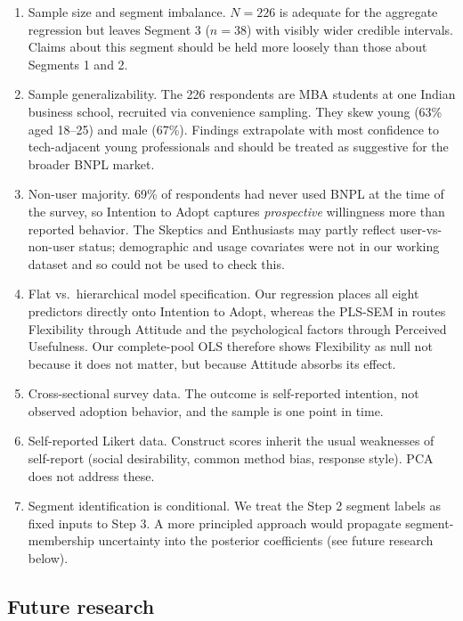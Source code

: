 \documentclass[11pt]{article}
\begin{document}
\begin{enumerate}
  \item Sample size and segment imbalance. $N = 226$ is adequate for
        the aggregate regression but leaves Segment 3 ($n = 38$)
        with visibly wider credible intervals. Claims about this
        segment should be held more loosely than those about
        Segments 1 and 2.
  \item Sample generalizability. The 226 respondents are MBA
        students at one Indian business school, recruited via
        convenience sampling. They skew young (63\% aged 18--25)
        and male (67\%). Findings extrapolate with most confidence
        to tech-adjacent young professionals and should be treated
        as suggestive for the broader BNPL market.
  \item Non-user majority. 69\% of respondents had never used BNPL
        at the time of the survey, so Intention to Adopt captures
        \emph{prospective} willingness more than reported behavior.
        The Skeptics and Enthusiasts may partly reflect
        user-vs-non-user status; demographic and usage covariates
        were not in our working dataset and so could not be used to
        check this.
  \item Flat vs.\ hierarchical model specification. Our regression
        places all eight predictors directly onto Intention to
        Adopt, whereas the PLS-SEM in \citet{dadra2024tep} routes
        Flexibility through Attitude and the psychological factors
        through Perceived Usefulness. Our complete-pool OLS
        therefore shows Flexibility as null not because it does not
        matter, but because Attitude absorbs its effect.
  \item Cross-sectional survey data. The outcome is self-reported
        intention, not observed adoption behavior, and the sample
        is one point in time.
  \item Self-reported Likert data. Construct scores inherit the
        usual weaknesses of self-report (social desirability,
        common method bias, response style). PCA does not address
        these.
  \item Segment identification is conditional. We treat the Step 2
        segment labels as fixed inputs to Step 3. A more principled
        approach would propagate segment-membership uncertainty
        into the posterior coefficients (see future research
        below).
\end{enumerate}

\subsection{Future research}
\end{document}
